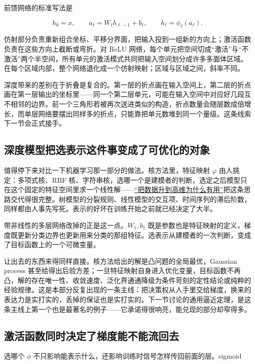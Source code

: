 前馈网络的标准写法是

\[
h_0=x,\qquad
a_\ell=W_\ell h_{\ell-1}+b_\ell,\qquad
h_\ell=\phi_\ell(a_\ell).
\]

仿射部分负责重新组合坐标、平移分界面，把输入投到一组新的方向上；激活函数负责在这些方向上截断或弯折。对 ReLU 网络，每个单元把空间切成``激活''与``不激活''两个半空间，所有单元的激活模式共同把输入空间划分成许多多面体区域。在每个区域内部，整个网络退化成一个仿射映射；区域与区域之间，斜率不同。

深度带来的差别在于折叠是复合的。第一层的折点画在输入空间上，第二层的折点画在第一层输出的坐标里——同一个第二层单元，可能在输入空间中对应好几段互不相邻的边界。前一个三角形若被再次送进类似的构造，折点数量会随层数成倍增长，而单层网络要摆出同样多的折点，只能靠把单元数堆到同一个量级。这条线索下一节会正式接手。

\subsection{深度模型把选表示这件事变成了可优化的对象}

值得停下来对比一下机器学习那一部分的做法。核方法里，特征映射 \(\varphi\) 由人挑定：多项式核、RBF 核、字符串核，选哪一个是建模者的判断，选定之后模型只在这个固定的特征空间里求一个线性解——\hyperref[sec:13-Machine-Learning/09-Kernel-Methods-and-Gaussian-Processes/01]{``把数据升到高维为什么有用''}把这条思路交代得很完整。树模型的分裂规则、线性模型的交互项、时间序列的滞后阶数，同样都由人事先写死。表示的好坏在训练开始之前就已经决定了大半。

带非线性的多层网络改掉的正是这一点。\(W_1,b_1\) 既是参数也是特征映射的定义，梯度既更新分类边界也更新用来分类的那组特征。选表示从建模者的一次判断，变成了目标函数上的一个可微变量。

让出去的东西来得同样直接。核方法给出的解是凸问题的全局最优，Gaussian process 甚至给得出后验方差；一旦特征映射自身进入优化变量，目标函数不再凸，解的存在唯一性、收敛速度、泛化界通通降级为条件苛刻的定性结论或纯粹的经验规律。这是本部分反复出现的一条主线：把决策权从人手里交给梯度，换来的表达力是实打实的，丢掉的保证也是实打实的。下一节讨论的通用逼近定理，是这条主线上第一个也是最著名的例子——它承诺得很响亮，能兑现的部分却窄得多。

\subsection{激活函数同时决定了梯度能不能流回去}

选哪个 \(\phi\) 不只影响能表示什么，还影响训练时信号怎样传回前面的层。sigmoid

